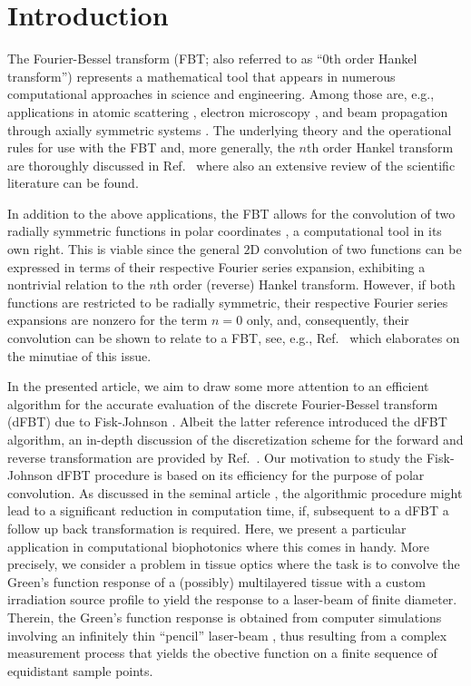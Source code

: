 \documentclass[review]{elsarticle}
\begin{document}
\section{Introduction}

The Fourier-Bessel transform (FBT; also referred to as ``$0$th order Hankel
transform'') represents a mathematical tool that appears in numerous
computational approaches in science and engineering.  Among those are, e.g.,
applications in atomic scattering \cite{Talman:1978}, electron microscopy
\cite{FiskJohnson:1987}, and beam propagation through axially symmetric systems
\cite{GuizarSicairos:2004}.
The underlying theory and the operational rules for use with the FBT and, more
generally, the $n$th order Hankel transform are thoroughly discussed in
Ref.~\cite{Baddour:2015} where also an extensive review of the scientific
literature can be found.

In addition to the above applications, the FBT allows for the convolution of
two radially symmetric functions in polar coordinates \cite{Baddour:2009}, a
computational tool in its own right.  This is viable since the general $2$D
convolution of two functions can be expressed in terms of their respective
Fourier series expansion, exhibiting a nontrivial relation to the $n$th order
(reverse) Hankel transform. 
However, if both functions are restricted to be radially symmetric, their
respective Fourier series expansions are nonzero for the term $n=0$ only, and,
consequently, their convolution can be shown to relate to a FBT, see, e.g., 
Ref.~\cite{Baddour:2009} which elaborates  on the minutiae of this issue.  

In the presented article, we aim to draw some more attention to an efficient 
algorithm for the accurate evaluation of the discrete Fourier-Bessel transform 
(dFBT) due to Fisk-Johnson \cite{FiskJohnson:1987}. Albeit the latter reference
introduced the dFBT algorithm, an in-depth discussion of the discretization 
scheme for the forward and reverse transformation are provided by 
Ref.~\cite{Baddour:2015}.
Our motivation to study the Fisk-Johnson dFBT procedure is based on its
efficiency for the purpose of polar convolution. As discussed in 
the seminal article \cite{FiskJohnson:1987}, the algorithmic procedure might 
lead to a significant reduction in computation time, if, subsequent to a
dFBT a follow up back transformation is required. 
Here, we present a particular application in computational biophotonics where 
this comes in handy. 
More precisely, we consider a problem in tissue optics where the task is to
convolve the Green's function response of a (possibly) multilayered tissue 
with a custom irradiation source profile to yield the response to a laser-beam 
of finite diameter.
Therein, the Green's function response is obtained from computer simulations 
involving an infinitely thin ``pencil'' laser-beam \cite{MCML:1995}, thus 
resulting from a complex measurement process that yields the obective 
function on a finite sequence of equidistant sample points.
\end{document}
